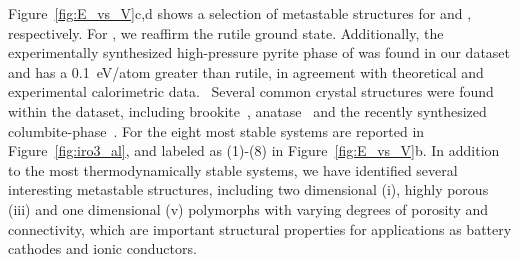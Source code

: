 %
Figure~\ref{fig:E_vs_V}c,d shows a selection of metastable structures for \IrOtwo and \IrOthree, respectively.
%
For \IrOtwo, we reaffirm the rutile ground state.
%
Additionally, the experimentally synthesized high-pressure pyrite phase of \IrOtwo was found in our dataset and has a \DHf \mytilde\SI{0.1}{\electronvolt}/atom greater than rutile,
in agreement with theoretical and experimental calorimetric data.~\cite{bolzan1997structural, shirako2014synthesis}
%
%
Several common \ABtwo crystal structures were found within the dataset,
including brookite~\cite{brookite}, anatase~\cite{anatase} and the recently synthesized columbite-\IrOtwo phase~\cite{Lee2020}.
%
For \IrOthree the eight most stable systems are reported in Figure~\ref{fig:iro3_al}, and labeled as (1)-(8) in Figure~\ref{fig:E_vs_V}b.
%
In addition to the most thermodynamically stable systems,
we have identified several interesting metastable structures,
including two dimensional (i), highly porous (iii) and one dimensional (v) polymorphs with varying degrees of porosity and connectivity,
which are important structural properties for applications as battery cathodes and ionic conductors.~\cite{Pearce2017,Pearce2019}
%
